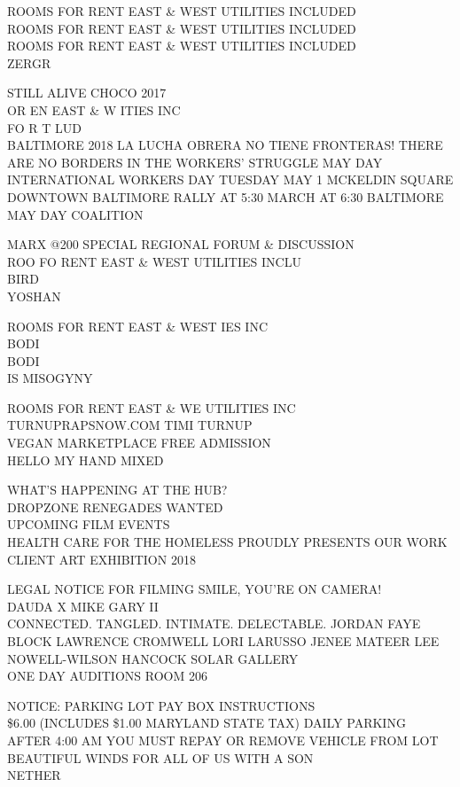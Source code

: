 \documentclass[10pt,letterpaper]{article}
\begin{document}
ROOMS FOR RENT EAST \& WEST UTILITIES INCLUDED\\
ROOMS FOR RENT EAST \& WEST UTILITIES INCLUDED\\
ROOMS FOR RENT EAST \& WEST UTILITIES INCLUDED\\
ZERGR

STILL ALIVE CHOCO 2017\\
OR EN EAST \& W ITIES INC\\
FO R T LUD\\
BALTIMORE 2018 LA LUCHA OBRERA NO TIENE FRONTERAS!  THERE ARE NO BORDERS IN THE WORKERS' STRUGGLE MAY DAY INTERNATIONAL WORKERS DAY TUESDAY MAY 1 MCKELDIN SQUARE DOWNTOWN BALTIMORE RALLY AT 5:30 MARCH AT 6:30 BALTIMORE MAY DAY COALITION

MARX @200 SPECIAL REGIONAL FORUM \& DISCUSSION\\
ROO FO RENT EAST \& WEST UTILITIES INCLU\\
BIRD\\
YOSHAN

ROOMS FOR RENT EAST \& WEST IES INC\\
BODI\\
BODI\\
IS MISOGYNY

ROOMS FOR RENT EAST \& WE UTILITIES INC\\
TURNUPRAPSNOW.COM TIMI TURNUP\\
VEGAN MARKETPLACE FREE ADMISSION\\
HELLO MY HAND MIXED

WHAT'S HAPPENING AT THE HUB?\\
DROPZONE RENEGADES WANTED\\
UPCOMING FILM EVENTS\\
HEALTH CARE FOR THE HOMELESS PROUDLY PRESENTS OUR WORK CLIENT ART EXHIBITION 2018

LEGAL NOTICE FOR FILMING SMILE, YOU'RE ON CAMERA!\\
DAUDA X MIKE GARY II\\
CONNECTED.  TANGLED.  INTIMATE.  DELECTABLE.  JORDAN FAYE BLOCK LAWRENCE CROMWELL LORI LARUSSO JENEE MATEER LEE NOWELL{-}WILSON HANCOCK SOLAR GALLERY\\
ONE DAY AUDITIONS ROOM 206

NOTICE: PARKING LOT PAY BOX INSTRUCTIONS\\
\$6.00 (INCLUDES \$1.00 MARYLAND STATE TAX) DAILY PARKING AFTER 4:00 AM YOU MUST REPAY OR REMOVE VEHICLE FROM LOT\\
BEAUTIFUL WINDS FOR ALL OF US WITH A SON\\
NETHER
\end{document}
